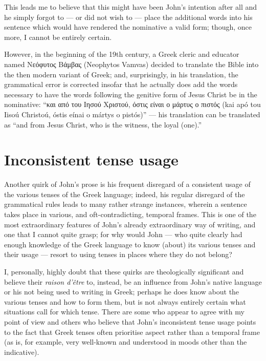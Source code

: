 This leads me to believe that this might have been John’s intention after all and he simply forgot to — or did not wish to — place the additional words into his sentence which would have rendered the nominative a valid form; though, once more, I cannot be entirely certain.

However, in the beginning of the 19th century, a Greek cleric and educator named Νεόφυτος Βάμβας (Neophytos Vamvas) decided to translate the Bible into the then modern variant of Greek; and, surprisingly, in his translation, the grammatical error is corrected insofar that he actually does add the words necessary to have the words following the genitive form of Jesus Christ be in the nominative: “και από του Ιησού Χριστού, όστις είναι ο μάρτυς ο πιστός (kai apó tou Iisoú Christoú, óstis eínai o mártys o pistós)” — his translation can be translated as “and from Jesus Christ, who is the witness, the loyal (one).”

\section*{Inconsistent tense usage}
  
  Another quirk of John’s prose is his frequent disregard of a consistent usage of the various tenses of the Greek language; indeed, his regular disregard of the grammatical rules leads to many rather strange instances, wherein a sentence takes place in various, and oft-contradicting, temporal frames. This is one of the most extraordinary features of John’s already extraordinary way of writing, and one that I cannot quite grasp; for why would John — who quite clearly had enough knowledge of the Greek language to know (about) its various tenses and their usage — resort to using tenses in places where they do not belong? 

I, personally, highly doubt that these quirks are theologically significant and believe their \textit{raison d’être} to, instead, be an influence from John’s native language or his not being used to writing in Greek; perhaps he does know about the various tenses and how to form them, but is not always entirely certain what situations call for which tense. There are some who appear to agree with my point of view and others who believe that John’s inconsistent tense usage points to the fact that Greek tenses often prioritise aspect rather than a temporal frame (as is, for example, very well-known and understood in moods other than the indicative). 

